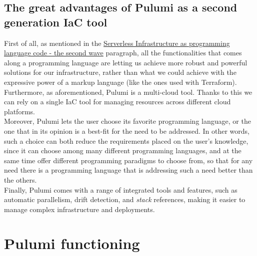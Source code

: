 \subsection{The great advantages of Pulumi as a second generation IaC tool}
First of all, as mentioned in the \hyperref[sssec:second-wave]{Serverless Infrastructure as programming language code - the second wave} paragraph, all the functionalities that comes along a programming language are letting us achieve more robust and powerful solutions for our infrastructure, rather than what we could achieve with the expressive power of a markup language (like the ones used with \gls{Terraform}).\\
Furthermore, as aforementioned, Pulumi is a multi-cloud tool. Thanks to this we can rely on a single IaC tool for managing resources across different cloud platforms.\\
Moreover, Pulumi lets the user choose its favorite programming language, or the one that in its opinion is a best-fit for the need to be addressed.
In other words, such a choice can both reduce the requirements placed on the user's knowledge, since it can choose among many different programming languages, 
and at the same time offer different programming paradigms to choose from, so that for any need there is a programming language that is addressing such a need better than the others.\\
Finally, Pulumi comes with a range of integrated tools and features, such as automatic parallelism, drift detection, and \textit{stack} references, making it easier to manage complex infrastructure and deployments.

\section{Pulumi functioning}

